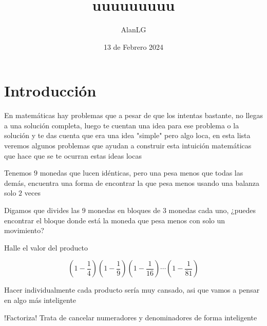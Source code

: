 \documentclass[11pt]{scrartcl}
\title{uuuuuuuuu}
\author{AlanLG}
\date{13 de Febrero 2024}
\begin{document}
\maketitle

\section{Introducción}

En matemáticas hay problemas que a pesar de que los intentas bastante, no llegas a una solución completa, luego te cuentan una idea para ese problema o la solución y te das cuenta que era una idea "simple" pero algo loca, en esta lista veremos algunos problemas que ayudan a construir esta intuición matemáticas que hace que se te ocurran estas ideas locas

\begin{example}

Tenemos $9$ monedas que lucen idénticas, pero una pesa menos que todas las demás, encuentra una forma de encontrar la que pesa menos usando una balanza solo $2$ veces
\end{example}

\begin{walkthrough} 
\begin{walk}
    \ii  Digamos que divides las $9$ monedas en bloques de $3$ monedas cada uno, ¿puedes encontrar el bloque donde está la moneda que pesa menos con solo un movimiento?
\end{walk}
\end{walkthrough}



\begin{example}
Halle el valor del producto

$$\left(1-\frac{1}{4}\right)\left(1-\frac{1}{9}\right)\left(1-\frac{1}{16}\right)\cdots\left(1-\frac{1}{81}\right)$$

\end{example}

\begin{walkthrough} 
 Hacer individualmente cada producto sería muy cansado, asi que vamos a pensar en algo más inteligente
 \begin{walk}
    \ii  !Factoriza!  
    \ii Trata de cancelar numeradores y denominadores de forma inteligente
\end{walk}
\end{walkthrough}
\end{document}
